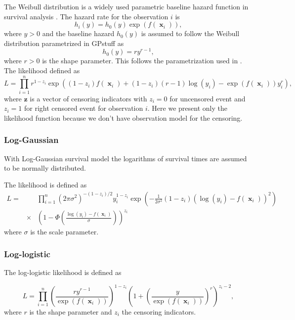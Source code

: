 \documentclass[twoside,11pt]{article}
\DeclareMathOperator{\x}{\mathbf{x}}
\newcommand{\pkg}[1]{{\fontseries{b}\selectfont #1}}
\begin{document}
The Weibull distribution is a widely used parametric baseline hazard
function in survival analysis \citep{Ibrahim+Chen+Sinha:2001}. The
hazard rate for the observation $i$ is
\begin{equation}
  h_i(y)=h_0(y)\exp(f(\x_i)),
\end{equation}
where $y>0$ and the baseline hazard $h_0(y)$ is assumed to follow the
Weibull distribution parametrized in \pkg{GPstuff} as
\begin{equation}
  h_0(y) = r y^{r-1},
\end{equation}
where $r>0$ is the shape parameter. This follows the parametrization
used in \citet{Martino:2011}. The likelihood defined as
\begin{equation}
  L = \prod_{i=1}^n r^{1-z_i} \exp \left( (1-z_i)f(\x_i)+(1-z_i)(r-1)\log(y_i)-\exp(f(\x_i))y_i^r \right),
\end{equation}
where $\mathbf{z}$ is a vector of censoring indicators with $z_i = 0$ for
uncensored event and $z_i = 1$ for right censored event for
observation $i$. Here we present only the likelihood function because we don't have observation model for the censoring. 

\subsubsection{Log-Gaussian}
With Log-Gaussian survival model the logarithms of survival times are assumed to be normally distributed.

The likelihood is defined as
\begin{eqnarray}
  L = && \prod_{i=1}^n (2\pi \sigma^2)^{-(1-z_i)/2}y_i^{1-z_i} \exp \left(-\frac{1}{2\sigma^2}(1-z_i)(\log (y_i) - f(\x_i))^2\right) \\ \nonumber
  &\times & \left(1 - \Phi \left(\frac{\log(y_i) - f(\x_i)}{\sigma}\right)\right)^{z_i} 
\end{eqnarray}
where $\sigma$ is the scale parameter.

\subsubsection{Log-logistic}

The log-logistic likelihood is defined as

\begin{equation}
  L = \prod_{i=1}^n \left( \frac{ry^{r-1}}{\exp(f(\x_i))} \right)^{1-z_i} \left( 1 + \left(\frac{y}{\exp(f(\x_i))}\right)^r \right)^{z_i-2},
\end{equation}
where $r$ is the shape parameter and $z_i$ the censoring indicators.
%                           
\end{document}
